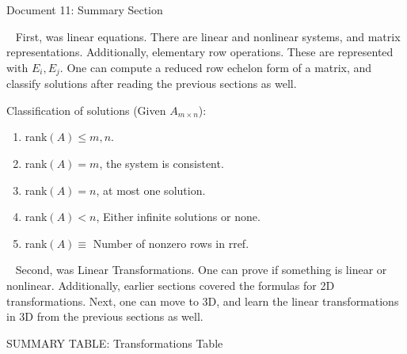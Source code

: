 \documentclass[12pt]{article}
\begin{document}
\newpage
\begin{center}
Document 11: Summary Section
\end{center}

\setlength{\leftskip}{0 in}
$\,\,\,$ First, was linear equations. There are linear and nonlinear systems, and matrix representations. Additionally, elementary row operations. These are represented with $E_i,E_j$. One can compute a reduced row echelon form of a matrix, and classify solutions after reading the previous sections as well.

Classification of solutions (Given $A_{m\times n}$):
\begin{enumerate}
\item rank$(A)\leq m,n$.
\item rank$(A)=m$, the system is consistent.
\item rank$(A)=n$, at most one solution.
\item rank$(A)<n$, Either infinite solutions or none.
\item rank$(A)\equiv$ Number of nonzero rows in rref.
\end{enumerate}

$\,\,\,$ Second, was Linear Transformations. One can prove if something is linear or nonlinear. Additionally, earlier sections covered the formulas for 2D transformations. Next, one can move to 3D, and learn the linear transformations in 3D from the previous sections as well.

\begin{center}
SUMMARY TABLE: Transformations Table
\end{center}
\end{document}
